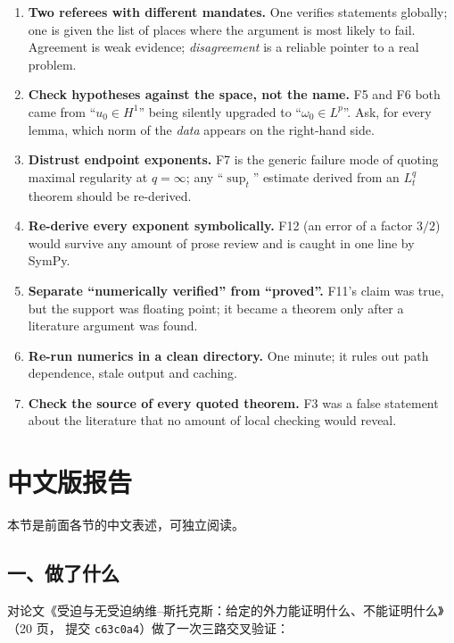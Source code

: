 \documentclass[11pt,a4paper]{article}
\begin{document}
\begin{enumerate}[label=\textbf{R\arabic*.},leftmargin=2.2em]
\item \textbf{Two referees with different mandates.} One verifies statements globally; one is
given the list of places where the argument is most likely to fail. Agreement is weak evidence;
\emph{disagreement} is a reliable pointer to a real problem.
\item \textbf{Check hypotheses against the space, not the name.} F5 and F6 both came from
``$u_0\in H^1$'' being silently upgraded to ``$\omega_0\in L^p$''. Ask, for every lemma, which
norm of the \emph{data} appears on the right-hand side.
\item \textbf{Distrust endpoint exponents.} F7 is the generic failure mode of quoting maximal
regularity at $q=\infty$; any ``$\sup_t$'' estimate derived from an $L^q_t$ theorem should be
re-derived.
\item \textbf{Re-derive every exponent symbolically.} F12 (an error of a factor $3/2$) would
survive any amount of prose review and is caught in one line by SymPy.
\item \textbf{Separate ``numerically verified'' from ``proved''.} F11's claim was true, but the
support was floating point; it became a theorem only after a literature argument was found.
\item \textbf{Re-run numerics in a clean directory.} One minute; it rules out path dependence,
stale output and caching.
\item \textbf{Check the source of every quoted theorem.} F3 was a false statement about the
literature that no amount of local checking would reveal.
\end{enumerate}

\section{中文版报告}\label{sec:zh}

本节是前面各节的中文表述，可独立阅读。

\subsection*{一、做了什么}

对论文《受迫与无受迫纳维--斯托克斯：给定的外力能证明什么、不能证明什么》（20 页，
提交 \texttt{c63c0a4}）做了一次三路交叉验证：
\end{document}
